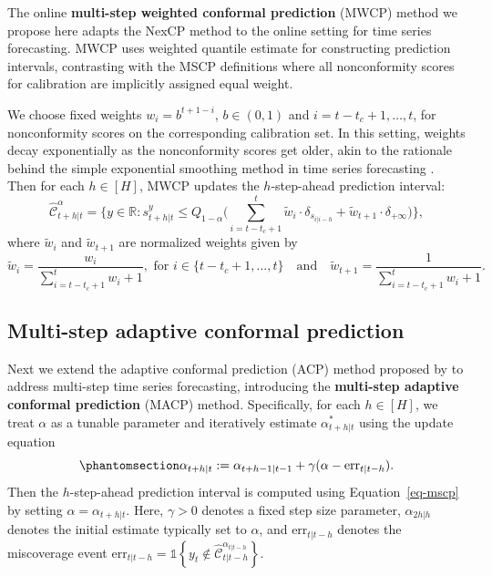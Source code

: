 \documentclass[
  11pt,
  a4paper,
]{article}
\theoremstyle{plain}
\theoremstyle{remark}
\begin{document}
The online \textbf{multi-step weighted conformal prediction} (MWCP)
method we propose here adapts the NexCP method to the online setting for
time series forecasting. MWCP uses weighted quantile estimate for
constructing prediction intervals, contrasting with the MSCP definitions
where all nonconformity scores for calibration are implicitly assigned
equal weight.

We choose fixed weights \(w_i = b^{t+1-i}\), \(b \in (0, 1)\) and
\(i=t-t_c+1,\ldots,t\), for nonconformity scores on the corresponding
calibration set. In this setting, weights decay exponentially as the
nonconformity scores get older, akin to the rationale behind the simple
exponential smoothing method in time series forecasting
\autocite{hyndman2021}. Then for each \(h \in [H]\), MWCP updates the
\(h\)-step-ahead prediction interval: \[
\hat{\mathcal{C}}_{t+h|t}^{\alpha} = \Bigg\{y\in\mathbb{R}: s_{t+h|t}^{y} \leq Q_{1-\alpha}\Bigg(\sum_{i=t-t_c+1}^{t}\tilde{w}_i\cdot\delta_{s_{i|i-h}}+\tilde{w}_{t+1}\cdot\delta_{+\infty}\Bigg)\Bigg\},
\] where \(\tilde{w}_i\) and \(\tilde{w}_{t+1}\) are normalized weights
given by \[
\tilde{w}_i = \frac{w_i}{\sum_{i=t-t_c+1}^{t}w_i+1}, \text{ for } i \in \{t-t_c+1,\ldots,t\} \quad \text{and} \quad \tilde{w}_{t+1} =  \frac{1}{\sum_{i=t-t_c+1}^{t}w_i+1}.
\]

\subsection{Multi-step adaptive conformal
prediction}\label{multi-step-adaptive-conformal-prediction}

Next we extend the adaptive conformal prediction (ACP) method proposed
by \textcite{gibbs2021} to address multi-step time series forecasting,
introducing the \textbf{multi-step adaptive conformal prediction} (MACP)
method. Specifically, for each \(h \in [H]\), we treat \(\alpha\) as a
tunable parameter and iteratively estimate \(\alpha_{t+h|t}^{*}\) using
the update
equation
\begin{equation}\phantomsection\label{eq-macp}{
\alpha_{t+h|t} := \alpha_{t+h-1|t-1} + \gamma(\alpha - \mathrm{err}_{t|t-h}).
}\end{equation} Then the \(h\)-step-ahead prediction interval is
computed using Equation~\ref{eq-mscp} by setting
\(\alpha = \alpha_{t+h|t}\). Here, \(\gamma > 0\) denotes a fixed step
size parameter, \(\alpha_{2h|h}\) denotes the initial estimate typically
set to \(\alpha\), and \(\mathrm{err}_{t|t-h}\) denotes the miscoverage
event
\(\mathrm{err}_{t|t-h} = \mathbb{1}\left\{y_t \notin \hat{\mathcal{C}}_{t|t-h}^{\alpha_{t|t-h}}\right\}\).
\end{document}
